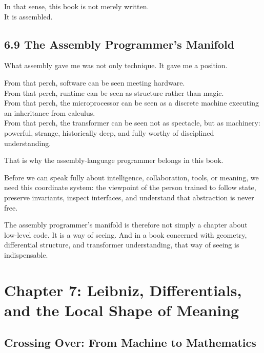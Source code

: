 In that sense, this book is not merely written.\\
It is assembled.

\hypertarget{the-assembly-programmers-manifold}{%
\subsection{6.9 The Assembly Programmer's
Manifold}\label{the-assembly-programmers-manifold}}

What assembly gave me was not only technique. It gave me a position.

From that perch, software can be seen meeting hardware.\\
From that perch, runtime can be seen as structure rather than magic.\\
From that perch, the microprocessor can be seen as a discrete machine
executing an inheritance from calculus.\\
From that perch, the transformer can be seen not as spectacle, but as
machinery: powerful, strange, historically deep, and fully worthy of
disciplined understanding.

That is why the assembly-language programmer belongs in this book.

Before we can speak fully about intelligence, collaboration, tools, or
meaning, we need this coordinate system: the viewpoint of the person
trained to follow state, preserve invariants, inspect interfaces, and
understand that abstraction is never free.

The assembly programmer's manifold is therefore not simply a chapter
about low-level code. It is a way of seeing. And in a book concerned
with geometry, differential structure, and transformer understanding,
that way of seeing is indispensable.

\newpage
\vspace*{3cm}

\hypertarget{chapter-7-leibniz-differentials-and-the-local-shape-of-meaning}{%
\section{Chapter 7: Leibniz, Differentials, and the Local Shape of
Meaning}\label{chapter-7-leibniz-differentials-and-the-local-shape-of-meaning}}

\hypertarget{crossing-over-from-machine-to-mathematics}{%
\subsection{Crossing Over: From Machine to
Mathematics}\label{crossing-over-from-machine-to-mathematics}}

